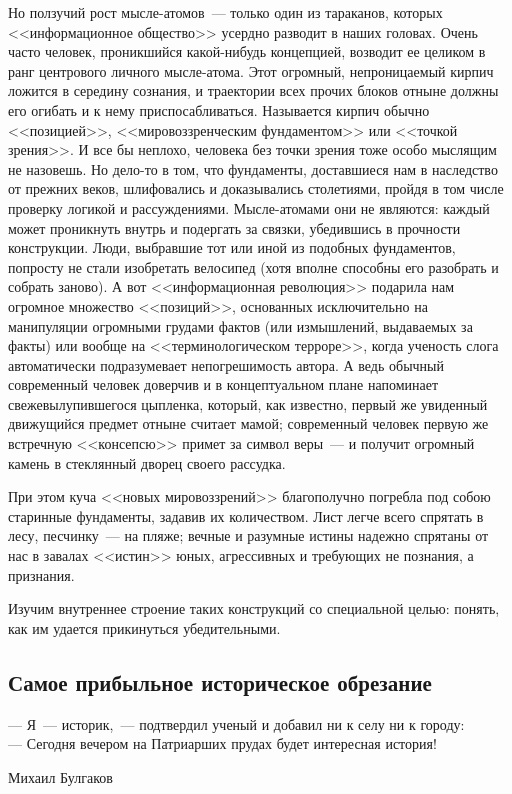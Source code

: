 \documentclass{scrbook}
\makeatletter
\newcommand{\defaultepigraphwidth}{0.5} %
\newcommand{\flqq}{<<}
\newcommand{\frqq}{>>}
\newcommand{\mdash}{~--- }
\newcommand{\sdash}{--- } %
\newcommand{\commamdash}{~--- } %
\newcommand{\essaysection}[1]{\subsection*{#1}\nopagebreak}
\newcommand{\myepigraph}[3][\@empty]{
	\ifx\@empty#1
		\setlength{\epigraphwidth}{\defaultepigraphwidth\textwidth}
	\else
		\setlength{\epigraphwidth}{#1\textwidth}
	\fi
	\epigraph{#2}{#3}
	\setlength{\epigraphwidth}{\defaultepigraphwidth\textwidth} %
	\nopagebreak
}
\makeatother
\begin{document}
Но ползучий рост мысле-атомов{\mdash}только один из тараканов, которых {\flqq}информационное общество{\frqq} усердно разводит в наших головах. Очень часто человек, проникшийся какой-нибудь концепцией, возводит ее целиком в ранг центрового личного мысле-атома. Этот огромный, непроницаемый кирпич ложится в середину сознания, и траектории всех прочих блоков отныне должны его огибать и к нему приспосабливаться. Называется кирпич обычно {\flqq}позицией{\frqq}, {\flqq}мировоззренческим фундаментом{\frqq} или {\flqq}точкой зрения{\frqq}. И все бы неплохо, человека без точки зрения тоже особо мыслящим не назовешь. Но дело-то в том, что фундаменты, доставшиеся нам в наследство от прежних веков, шлифовались и доказывались столетиями, пройдя в том числе проверку логикой и рассуждениями. Мысле-атомами они не являются: каждый может проникнуть внутрь и подергать за связки, убедившись в прочности конструкции. Люди, выбравшие тот или иной из подобных фундаментов, попросту не стали изобретать велосипед (хотя вполне способны его разобрать и собрать заново). А вот {\flqq}информационная революция{\frqq} подарила нам огромное множество {\flqq}позиций{\frqq}, основанных исключительно на манипуляции огромными грудами фактов (или измышлений, выдаваемых за факты) или вообще на {\flqq}терминологическом терроре{\frqq}, когда ученость слога автоматически подразумевает непогрешимость автора. А ведь обычный современный человек доверчив и в концептуальном плане напоминает свежевылупившегося цыпленка, который, как известно, первый же увиденный движущийся предмет отныне считает мамой; современный человек первую же встречную {\flqq}консепсю{\frqq} примет за символ веры{\mdash}и получит огромный камень в стеклянный дворец своего рассудка.

При этом куча {\flqq}новых мировоззрений{\frqq} благополучно погребла под собою старинные фундаменты, задавив их количеством. Лист легче всего спрятать в лесу, песчинку{\mdash}на пляже; вечные и разумные истины надежно спрятаны от нас в завалах {\flqq}истин{\frqq} юных, агрессивных и требующих не познания, а признания.

Изучим внутреннее строение таких конструкций со специальной целью: понять, как им удается прикинуться убедительными.

\essaysection{Самое прибыльное историческое обрезание}

\myepigraph{{\sdash} Я{\mdash}историк,{\commamdash}подтвердил ученый и добавил ни к селу ни к городу: \\
{\sdash} Сегодня вечером на Патриарших прудах будет интересная история!}
{Михаил Булгаков}
\end{document}
